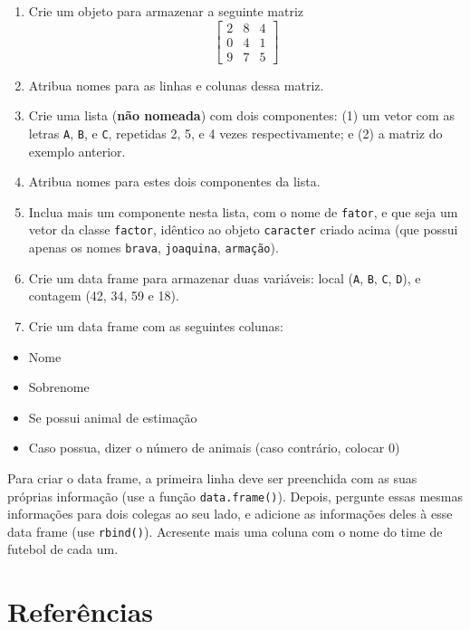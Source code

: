 \documentclass[10pt,a4paper]{book}
\providecommand{\tightlist}{%
  \setlength{\itemsep}{0pt}\setlength{\parskip}{0pt}}
\begin{document}
\begin{enumerate}
\def\labelenumi{\arabic{enumi}.}
\tightlist
\item
  Crie um objeto para armazenar a seguinte matriz
  \[\left[ \begin{array}{ccc}
          2 & 8 & 4 \\
          0 & 4 & 1 \\
          9 & 7 & 5
          \end{array} \right]\]
\item
  Atribua nomes para as linhas e colunas dessa matriz.
\item
  Crie uma lista (\textbf{não nomeada}) com dois componentes: (1) um
  vetor com as letras \texttt{A}, \texttt{B}, e \texttt{C}, repetidas 2,
  5, e 4 vezes respectivamente; e (2) a matriz do exemplo anterior.
\item
  Atribua nomes para estes dois componentes da lista.
\item
  Inclua mais um componente nesta lista, com o nome de \texttt{fator}, e
  que seja um vetor da classe \texttt{factor}, idêntico ao objeto
  \texttt{caracter} criado acima (que possui apenas os nomes
  \texttt{brava}, \texttt{joaquina}, \texttt{armação}).
\item
  Crie um data frame para armazenar duas variáveis: local (\texttt{A},
  \texttt{B}, \texttt{C}, \texttt{D}), e contagem (42, 34, 59 e 18).
\item
  Crie um data frame com as seguintes colunas:
\end{enumerate}

\begin{itemize}
\tightlist
\item
  Nome
\item
  Sobrenome
\item
  Se possui animal de estimação
\item
  Caso possua, dizer o número de animais (caso contrário, colocar 0)
\end{itemize}

Para criar o data frame, a primeira linha deve ser preenchida com as
suas próprias informação (use a função \texttt{data.frame()}). Depois,
pergunte essas mesmas informações para dois colegas ao seu lado, e
adicione as informações deles à esse data frame (use \texttt{rbind()}).
Acresente mais uma coluna com o nome do time de futebol de cada um.

\section*{Referências}\label{referencias-1}
\end{document}
